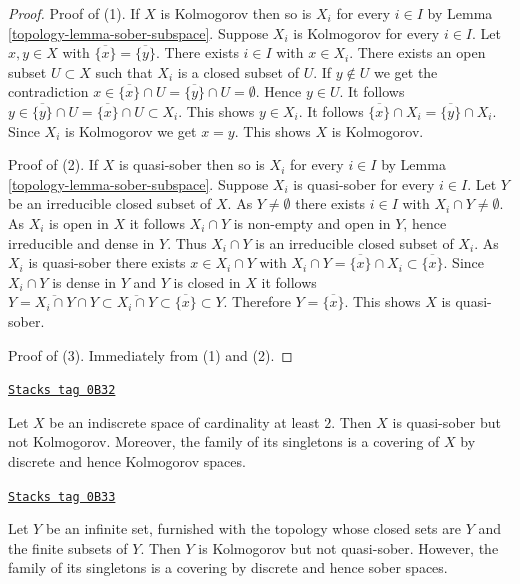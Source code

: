 \begin{proof}

Proof of (1). If $X$ is Kolmogorov then so is $X_i$ for every $i\in I$ by
Lemma \ref{topology-lemma-sober-subspace}. Suppose $X_i$ is Kolmogorov for every
$i\in I$. Let $x,y\in X$ with $\overline{\{x\}}=\overline{\{y\}}$. There exists
$i\in I$ with $x\in X_i$. There exists an open subset $U\subset X$ such that
$X_i$ is a closed subset of $U$. If $y\notin U$ we get the contradiction
$x\in\overline{\{x\}}\cap U=\overline{\{y\}}\cap U=\emptyset$. Hence $y\in U$.
It follows $y\in\overline{\{y\}}\cap U=\overline{\{x\}}\cap U\subset X_i$.
This shows $y\in X_i$. It follows
$\overline{\{x\}}\cap X_i=\overline{\{y\}}\cap X_i$. Since $X_i$ is
Kolmogorov we get $x=y$. This shows $X$ is Kolmogorov.

\medskip\noindent
Proof of (2). If $X$ is quasi-sober then so is $X_i$ for every $i\in I$ by
Lemma \ref{topology-lemma-sober-subspace}. Suppose $X_i$ is quasi-sober for every
$i\in I$. Let $Y$ be an irreducible closed subset of $X$. As $Y\neq\emptyset$
there exists $i\in I$ with $X_i\cap Y\neq\emptyset$. As $X_i$ is open in $X$ it
follows $X_i\cap Y$ is non-empty and open in $Y$, hence irreducible
and dense in $Y$. Thus $X_i\cap Y$ is an irreducible closed subset of $X_i$. As
$X_i$ is quasi-sober there exists $x\in X_i\cap Y$ with
$X_i\cap Y=\overline{\{x\}}\cap X_i\subset\overline{\{x\}}$. Since
$X_i\cap Y$ is dense in $Y$ and $Y$ is closed in $X$ it follows
$Y=\overline{X_i\cap Y}\cap Y\subset\overline{X_i\cap Y}\subset
\overline{\{x\}}\subset Y$. Therefore
$Y=\overline{\{x\}}$. This shows $X$ is quasi-sober.

\medskip\noindent
Proof of (3). Immediately from (1) and (2).
\end{proof}

\begin{example}
\label{topology-example-quasi-sober-not-kolmogorov}
\href{https://stacks.math.columbia.edu/tag/0B32}{\texttt{Stacks tag 0B32}}

Let $X$ be an indiscrete space of cardinality at least $2$. Then $X$ is
quasi-sober but not Kolmogorov. Moreover, the family of its singletons is a
covering of $X$ by discrete and hence Kolmogorov spaces.
\end{example}

\begin{example}
\label{topology-example-kolmogorov-not-quasi-sober}
\href{https://stacks.math.columbia.edu/tag/0B33}{\texttt{Stacks tag 0B33}}

Let $Y$ be an infinite set, furnished with the topology whose closed sets are
$Y$ and the finite subsets of $Y$. Then $Y$ is Kolmogorov but not quasi-sober.
However, the family of its singletons is
a covering by discrete and hence sober spaces.
\end{example}

